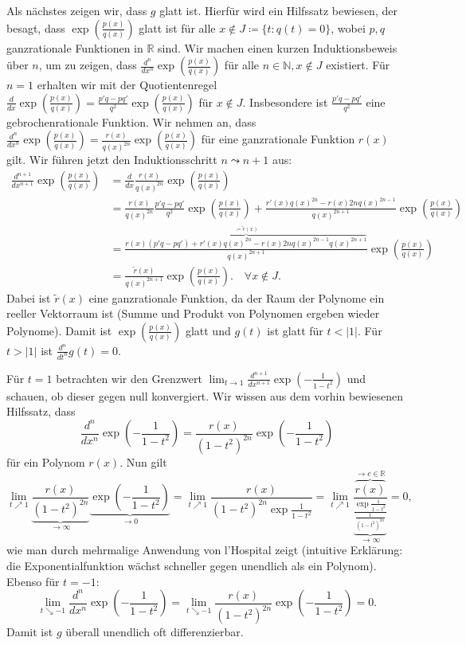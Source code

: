 \documentclass[a4paper,DIV=1]{article}
\theoremstyle{plain}
\begin{document}
\begin{enumerate}[label=(\roman*)]
	Als nächstes zeigen wir, dass $g$ glatt ist. Hierfür wird ein Hilfssatz bewiesen, der besagt, dass $\exp(\frac{p(x)}{q(x)})$ glatt ist für alle $x \notin J \coloneqq \{ t : q(t) = 0 \}$, wobei $p,q$ ganzrationale Funktionen in $\mathbb R$ sind. Wir machen einen kurzen Induktionsbeweis über $n$, um zu zeigen, dass $\frac{d^n}{dx^n}\exp(\frac{p(x)}{q(x)})$ für alle $n \in \mathbb N, x \notin J$ existiert. Für $n=1$ erhalten wir mit der Quotientenregel $\frac{d}{dx}\exp(\frac{p(x)}{q(x)}) = \frac{p'q-pq'}{q^2}\exp(\frac{p(x)}{q(x)})$ für $x \notin J$. Insbesondere ist $\frac{p'q-pq'}{q^2}$ eine gebrochenrationale Funktion. Wir nehmen an, dass $\frac{d^n}{dx^n}\exp(\frac{p(x)}{q(x)}) = \frac{r(x)}{q(x)^{2n}}\exp(\frac{p(x)}{q(x)})$ für eine ganzrationale Funktion $r(x)$ gilt. Wir führen jetzt den Induktionsschritt $n \leadsto n+1$ aus:
	\begin{align*}
		\frac{d^{n+1}}{dx^{n+1}} \exp(\frac{p(x)}{q(x)}) &= \frac{d}{dx}\frac{r(x)}{q(x)^{2n}}\exp(\frac{p(x)}{q(x)}) \\
		&= \frac{r(x)}{q(x)^{2n}}\frac{p'q-pq'}{q^2}\exp(\frac{p(x)}{q(x)}) + \frac{r'(x)q(x)^{2n} - r(x)2nq(x)^{2n-1}}{q(x)^{2n+1}}\exp(\frac{p(x)}{q(x)}) \\
		&= \frac{\overbrace{r(x)(p'q-pq') + r'(x)q(x)^{2n} - r(x)2nq(x)^{2n-1}q(x)^{2n+1}}^{\coloneqq \tilde r(x)}}{q(x)^{2n+1}}\exp(\frac{p(x)}{q(x)}) \\
		&= \frac{\tilde r(x)}{q(x)^{2n+1}}\exp(\frac{p(x)}{q(x)}). \quad  \forall x \notin J.
	\end{align*}
	Dabei ist $\tilde r(x)$ eine ganzrationale Funktion, da der Raum der Polynome ein reeller Vektorraum ist (Summe und Produkt von Polynomen ergeben wieder Polynome). Damit ist $\exp(\frac{p(x)}{q(x)})$ glatt und $g(t)$ ist glatt für $t < |1|$. Für $t>|1|$ ist $\frac{d^n}{dt^n}g(t) = 0$.
	
	Für $t = 1$ betrachten wir den Grenzwert $\lim_{t \to 1} \frac{d^{n+1}}{dx^{n+1}} \exp(-\frac{1}{1-t^2})$ und schauen, ob dieser gegen null konvergiert. Wir wissen aus dem vorhin bewiesenen Hilfssatz, dass
	\[
		\frac{d^{n}}{dx^{n}} \exp(-\frac{1}{1-t^2}) =  \frac{r(x)}{(1-t^2)^{2n}}\exp(-\frac{1}{1-t^2})
	\]
	für ein Polynom $r(x)$. Nun gilt 
	\[
		 \lim_{t \nearrow 1} \underbrace{\frac{r(x)}{(1-t^2)^{2n}}}_{\to \infty}\underbrace{\exp(-\frac{1}{1-t^2})}_{\to 0} = \lim_{t \nearrow 1} \frac{r(x)}{(1-t^2)^{2n}\exp{\frac{1}{1-t^2}} } = \lim_{t \nearrow 1} \frac{\overbrace{r(x)}^{\to c \in \mathbb R}}{\underbrace{\frac{\exp{\frac{1}{1-t^2}}}{\frac{1}{(1-t^2)^{2n}}}}_{\to \infty}} = 0,
	\]
	wie man durch mehrmalige Anwendung von l'Hospital zeigt (intuitive Erklärung: die Exponentialfunktion wächst schneller gegen unendlich als ein Polynom). Ebenso für $t = -1$:
	\[
		\lim_{t \searrow -1}\frac{d^{n}}{dx^{n}} \exp(-\frac{1}{1-t^2}) = \lim_{t \searrow -1} \frac{r(x)}{(1-t^2)^{2n}}\exp(-\frac{1}{1-t^2}) = 0.
	\]
	Damit ist $g$ überall unendlich oft differenzierbar.
	

\end{enumerate}
\end{document}
